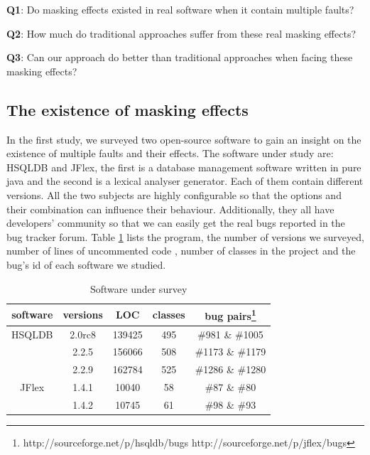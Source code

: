 \documentclass{sig-alternate}
\begin{document}
\textbf{Q1}: Do masking effects existed in real software when it contain multiple faults?

\textbf{Q2}: How much do traditional approaches suffer from these real masking effects?

\textbf{Q3}: Can our approach do better than traditional approaches when facing these masking effects?
%

\subsection{The existence of masking effects}
In the first study, we surveyed two open-source software to gain an insight on the existence of multiple faults and their effects. The software under study are: HSQLDB and JFlex, the first is a database management software written in pure java and the second is a lexical analyser generator. Each of them contain different versions. All the two subjects are highly configurable so that the options and their combination can influence their behaviour. Additionally, they all have developers' community so that we can easily get the real bugs reported in the bug tracker forum. Table \ref{software description} lists the program, the number of versions we surveyed, number of lines of uncommented code , number of classes in the project and the bug's id of each software we studied.

\begin{table}\renewcommand{\arraystretch}{1.3}
\caption{Software under survey}
\label{software description}
\begin{tabular}{c|c|c|c|c} \hline
software & versions & LOC & classes & bug pairs\footnote{ http://sourceforge.net/p/hsqldb/bugs
http://sourceforge.net/p/jflex/bugs  } \\ \hline

HSQLDB  &2.0rc8 & 139425 & 495 &  \#981 \& \#1005\\
	   &2.2.5 & 156066 & 508 & \#1173 \&  \#1179\\
	    &2.2.9 & 162784 &525 & \#1286 \& \#1280\\
JFlex  &1.4.1 &  10040 &58 & \#87 \& \#80 \\
      &1.4.2 &  10745 &61 &  \#98 \& \#93  \\
\hline\end{tabular}
\end{table}
\end{document}

